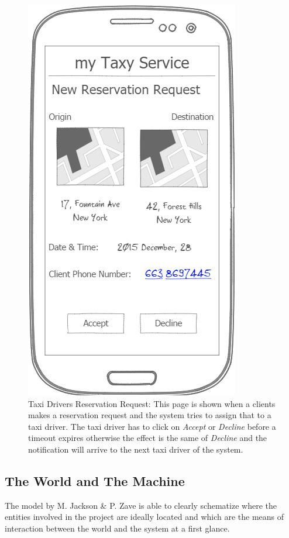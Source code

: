 \documentclass[a4paper]{article}
\begin{document}
\begin{figure}[H]
\includegraphics[width=\mockupWidth]{Mockup-TaxiDriversReservationRequest}
\centering
\caption[Taxi Drivers Reservation Request]{Taxi Drivers Reservation Request: \newline This page is shown when a clients makes a reservation request and the system tries to assign that to a taxi driver. The taxi driver has to click on \emph{Accept} or \emph{Decline} before a timeout expires otherwise the effect is the same of \emph{Decline} and the notification will arrive to the next taxi driver of the system.}
\label{fig:mockuptaxidriverireservationrequest}
\end{figure}
\clearpage
\subsection{The World and The Machine}The model by M. Jackson \& P. Zave is able to clearly schematize where the entities involved in the project are ideally located and which are the means of interaction between the world and the system at a first glance.
\end{document}

